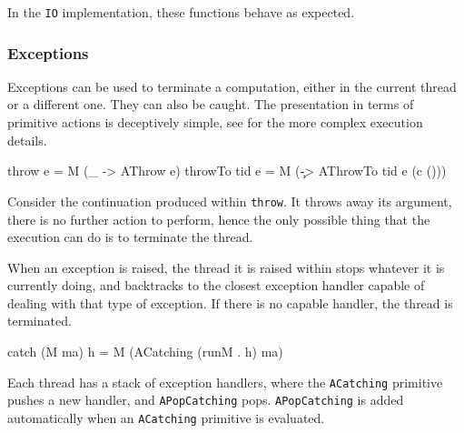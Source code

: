 In the \verb|IO| implementation, these functions behave as expected.

\subsubsection{Exceptions}
\label{sec:execution-primops-exceptions}

Exceptions can be used to terminate a computation, either in the
current thread or a different one. They can also be caught. The
presentation in terms of primitive actions is deceptively simple, see
 for the more complex execution details.

\begin{haskellcode}
throw       e = M (\_ -> AThrow e)
throwTo tid e = M (\c -> AThrowTo tid e (c ()))
\end{haskellcode}


Consider the continuation produced within \verb|throw|. It throws away
its argument, there is no further action to perform, hence the only
possible thing that the execution can do is to terminate the thread.


When an exception is raised, the thread it is raised within stops
whatever it is currently doing, and backtracks to the closest
exception handler capable of dealing with that type of exception. If
there is no capable handler, the thread is terminated.

\begin{haskellcode}
catch (M ma) h = M (ACatching (runM . h) ma)
\end{haskellcode}


Each thread has a stack of exception handlers, where the
\verb|ACatching| primitive pushes a new handler, and
\verb|APopCatching| pops. \verb|APopCatching| is added automatically
when an \verb|ACatching| primitive is evaluated.


